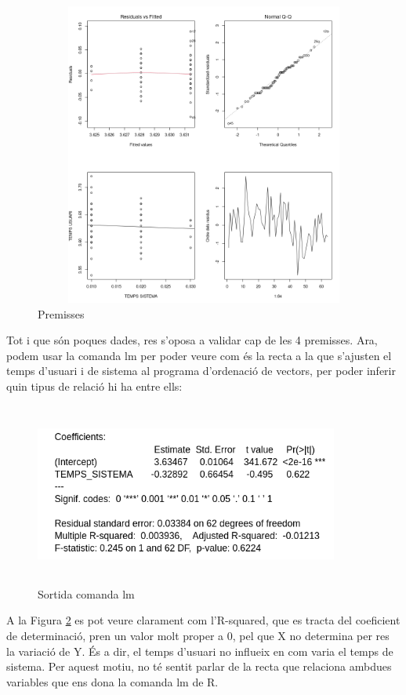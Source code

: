\documentclass[12pt]{article}
\begin{document}
\begin{figure}[h!]
  \centering
  \includegraphics[width=15cm, height=10cm]{prem2.png}
  \caption{Premisses}
  \label{fig:prem2}
\end{figure} 

Tot i que són poques dades, res s'oposa a validar cap de les 4 premisses.
Ara, podem usar la comanda lm per poder veure com és la recta a la que s'ajusten el temps d'usuari i de sistema al programa d'ordenació
de vectors, per poder inferir quin tipus de relació hi ha entre ells:

\begin{figure}[h!]
  \centering
  \includegraphics[width=10cm, height=6cm]{lm2.png}
  \caption{Sortida comanda lm}
  \label{fig:lm2}
\end{figure} 

A la Figura \ref{fig:lm2} es pot veure clarament com l'R-squared, que es tracta del coeficient de determinació, pren un valor molt proper
a 0, pel que X no determina per res la variació de Y. És a dir, el temps d'usuari no influeix en com varia el temps de sistema. Per aquest
motiu, no té sentit parlar de la recta que relaciona ambdues variables que ens dona la comanda lm de R.
\end{document}
